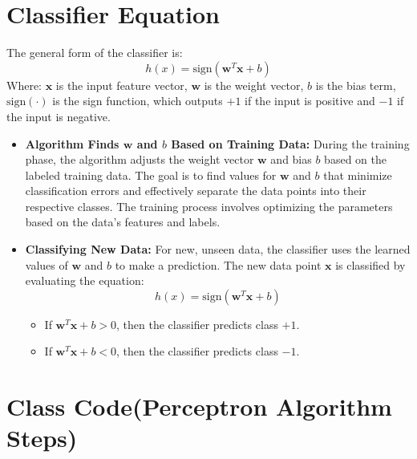 \section{Classifier Equation}


The general form of the classifier is:
\[
h(x) = \text{sign}(\mathbf{w}^T \mathbf{x} + b)
\]
Where:
\( \mathbf{x} \) is the input feature vector,
\( \mathbf{w} \) is the weight vector,
\( b \) is the bias term,
\( \text{sign}(\cdot) \) is the sign function, which outputs \( +1 \) if the input is positive and \( -1 \) if the input is negative.

\begin{itemize}
    \item \textbf{Algorithm Finds \( \mathbf{w} \) and \( b \) Based on Training Data:} 
    During the training phase, the algorithm adjusts the weight vector \( \mathbf{w} \) and bias \( b \) based on the labeled training data. The goal is to find values for \( \mathbf{w} \) and \( b \) that minimize classification errors and effectively separate the data points into their respective classes. The training process involves optimizing the parameters based on the data's features and labels.

    \item \textbf{Classifying New Data:} 
    For new, unseen data, the classifier uses the learned values of \( \mathbf{w} \) and \( b \) to make a prediction. The new data point \( \mathbf{x} \) is classified by evaluating the equation:
    \[
    h(x) = \text{sign}(\mathbf{w}^T \mathbf{x} + b)
    \]
    \begin{itemize}
        \item If \( \mathbf{w}^T \mathbf{x} + b > 0 \), then the classifier predicts class \( +1 \).
        \item If \( \mathbf{w}^T \mathbf{x} + b < 0 \), then the classifier predicts class \( -1 \).
    \end{itemize}
\end{itemize}

\section{Class Code(Perceptron Algorithm Steps)}

